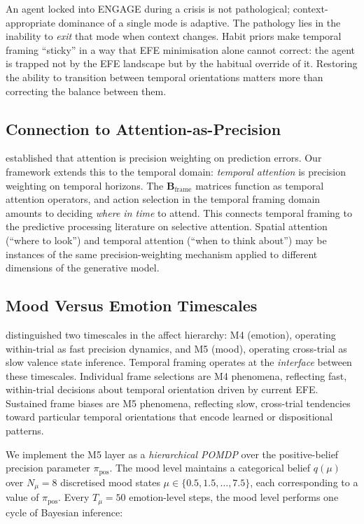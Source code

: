 \documentclass[11pt,a4paper]{article}
\begin{document}
An agent locked into ENGAGE during a crisis is not pathological; context-appropriate dominance of a single mode is adaptive. The pathology lies in the inability to \emph{exit} that mode when context changes. Habit priors make temporal framing ``sticky'' in a way that EFE minimisation alone cannot correct: the agent is trapped not by the EFE landscape but by the habitual override of it. Restoring the ability to transition between temporal orientations matters more than correcting the balance between them.

\subsection{Connection to Attention-as-Precision}\label{sec:attention_connection}

\citet{feldman2010attention} established that attention is precision weighting on prediction errors. Our framework extends this to the temporal domain: \emph{temporal attention} is precision weighting on temporal horizons. The $\mathbf{B}_{\text{frame}}$ matrices function as temporal attention operators, and action selection in the temporal framing domain amounts to deciding \emph{where in time} to attend. This connects temporal framing to the predictive processing literature on selective attention. Spatial attention (``where to look'') and temporal attention (``when to think about'') may be instances of the same precision-weighting mechanism applied to different dimensions of the generative model.

\subsection{Mood Versus Emotion Timescales}\label{sec:mood_emotion}

\citet{hesp2021deeply} distinguished two timescales in the affect hierarchy: M4 (emotion), operating within-trial as fast precision dynamics, and M5 (mood), operating cross-trial as slow valence state inference. Temporal framing operates at the \emph{interface} between these timescales. Individual frame selections are M4 phenomena, reflecting fast, within-trial decisions about temporal orientation driven by current EFE. Sustained frame biases are M5 phenomena, reflecting slow, cross-trial tendencies toward particular temporal orientations that encode learned or dispositional patterns.

We implement the M5 layer as a \emph{hierarchical POMDP} over the positive-belief precision parameter $\pi_{\text{pos}}$. The mood level maintains a categorical belief $q(\mu)$ over $N_\mu = 8$ discretised mood states $\mu \in \{0.5, 1.5, \ldots, 7.5\}$, each corresponding to a value of $\pi_{\text{pos}}$. Every $T_\mu = 50$ emotion-level steps, the mood level performs one cycle of Bayesian inference:
\end{document}
